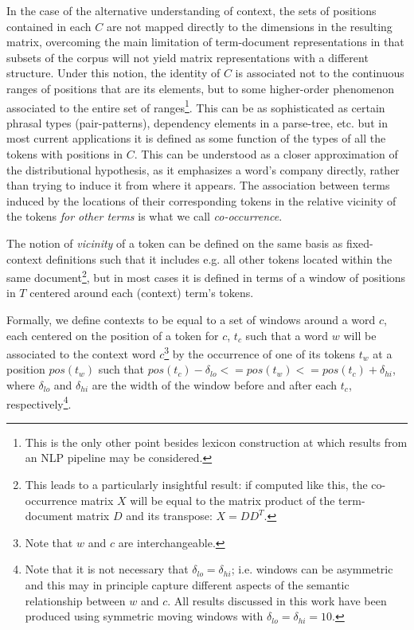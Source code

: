 In the case of the alternative understanding of context, the sets of positions contained in each $C$ are not mapped directly to the dimensions in the resulting matrix, overcoming the main limitation of term-document representations in that subsets of the corpus will not yield matrix representations with a different structure.
Under this notion, the identity of $C$ is associated not to the continuous ranges of positions that are its elements, but to some higher-order phenomenon associated to the entire set of ranges\footnote{
    This is the only other point besides lexicon construction at which results from an NLP pipeline may be considered.
}.
This can be as sophisticated as certain phrasal types (pair-patterns), dependency elements in a parse-tree, etc. but in most current applications it is defined as some function of the types of all the tokens with positions in $C$.
This can be understood as a closer approximation of the distributional hypothesis, as it emphasizes a word's company directly, rather than trying to induce it from where it appears.
The association between terms induced by the locations of their corresponding tokens in the relative vicinity of the tokens \emph{for other terms} is what we call \emph{co-occurrence}.

The notion of \emph{vicinity} of a token can be defined on the same basis as fixed-context definitions such that it includes e.g. all other tokens located within the same document\footnote{
    \label{foot:xddt}
    This leads to a particularly insightful result: if computed like this, the co-occurrence matrix $X$ will be equal to the matrix product of the term-document matrix $D$ and its transpose: $X = DD^T$.
}, but in most cases it is defined in terms of a window of positions in $T$ centered around each (context) term's tokens.

Formally, we define contexts to be equal to a set of windows around a word $c$, each centered on the position of a token for $c$, $t_c$ such that a word $w$ will be associated to the context word $c$\footnote{
    Note that $w$ and $c$ are interchangeable.
} by the occurrence of one of its tokens $t_w$ at a position $pos( t_w )$ such that $pos( t_c ) - \delta_{lo} <= pos( t_w ) <= pos( t_c ) + \delta_{hi}$, where $\delta_{lo}$ and $\delta_{hi}$ are the width of the window before and after each $t_c$, respectively\footnote{
    \label{foot:symmwindows}
    Note that it is not necessary that $\delta_{lo} = \delta_{hi}$; i.e. windows can be asymmetric and this may in principle capture different aspects of the semantic relationship between $w$ and $c$.
    All results discussed in this work have been produced using symmetric moving windows with $\delta_{lo} = \delta_{hi} = 10$.
}.


